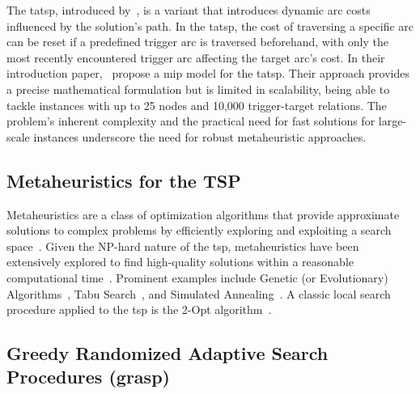 \documentclass[twocolumn]{article} %
\begin{document}
The \gls{tatsp}, introduced by~\citet{Cerrone}, is a variant that introduces dynamic arc costs influenced by the solution's path. 
In the \gls{tatsp}, the cost of traversing a specific arc can be reset if a predefined trigger arc is traversed beforehand, 
with only the most recently encountered trigger arc affecting the target arc's cost. In their introduction paper,~\citet{Cerrone} 
propose a \gls{mip} model for the \gls{tatsp}. Their approach provides a precise mathematical formulation 
but is limited in scalability, being able to tackle instances with up to 25 nodes and 10,000 trigger-target relations. 
The problem's inherent complexity and the practical need for fast solutions for large-scale instances underscore the need for robust metaheuristic approaches.

\subsection{Metaheuristics for the TSP}
\label{sec:metaheuristics_tsp}

Metaheuristics are a class of optimization algorithms that provide approximate solutions to complex problems by efficiently exploring and exploiting a search space~\cite{Gendreau2010}.
Given the NP-hard nature of the \gls{tsp}, metaheuristics have been extensively explored to find high-quality solutions within a reasonable computational time~\cite{toaza2023}.
Prominent examples include Genetic (or Evolutionary) Algorithms~\cite{Larranaga1999}, Tabu Search~\cite{Knox1994}, and Simulated Annealing~\cite{anttsp}.
A classic local search procedure applied to the \gls{tsp} is the 2-Opt algorithm~\cite{Croes1958}.

\subsection{Greedy Randomized Adaptive Search Procedures (\gls{grasp})}
\end{document}
